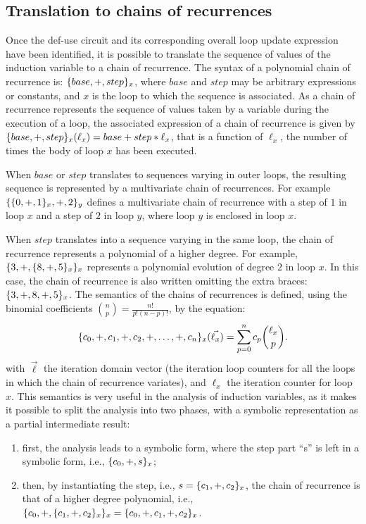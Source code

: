 \subsection{Translation to chains of recurrences}

Once the def-use circuit  and its corresponding overall loop
update expression have been identified, it is possible to translate the
sequence of values of the induction variable to a chain of recurrence.
The syntax of a polynomial chain of recurrence is: $\{base, +,
  step\}_x$, where $base$ and $step$ may be arbitrary expressions
or constants, and $x$ is the loop to which the sequence is
associated.  As a chain of recurrence represents the sequence of values
taken by a variable during the execution of a loop, the associated expression of a
chain of recurrence is given by $\{base, +, step\}_x (\ell_x) =
base + step * \ell_x$, that is a function of $\ell_x$,
the number of times the body of loop $x$ has been executed.

When $base$ or $step$ translates to sequences varying in outer
loops, the resulting sequence is represented by a multivariate chain
of recurrences.  For example $\{\{0, +, 1\}_x, +, 2\}_y$
defines a multivariate chain of recurrence with a step of $1$ in loop
$x$ and a step of $2$ in loop $y$, where loop $y$ is enclosed in loop
$x$.

When $step$ translates into a sequence varying in the same loop,
the chain of recurrence represents a polynomial of a higher degree.
For example, $\{3, +, \{8, +, 5\}_x\}_x$ represents a
polynomial evolution of degree $2$ in loop $x$.  In this case,
the chain of recurrence is also written omitting the extra braces:
$\{3, +, 8, +, 5\}_x$.  The semantics of the chains of recurrences
is defined, using the binomial coefficients $\binom{n}{p} = \frac{n!}{p!(n-p)!}$, by the
equation:
\begin{equation*}
  \{c_0,+,c_1,+,c_2,+,\ldots,+,c_n\}_x(\vec{\ell_x})=
  \sum_{p=0}^{n}c_{p}\binom{\ell_x}{p}.
\end{equation*}
with $\vec{\ell}$ the iteration domain vector (the iteration loop
counters for all the loops in which the chain of recurrence variates),
and $\ell_x$ the iteration counter for loop $x$.  This semantics is very useful in the analysis of induction variables, as it
makes it possible to split the analysis into two phases, with a
symbolic representation as a partial intermediate result:
\begin{enumerate}
\item first, the analysis leads to a symbolic form, where the step
  part ``s'' is left in a symbolic form, i.e., $\{c_0, +, s\}_x$;
\item then, by instantiating the step, i.e., $s = \{c_1, +,
  c_2\}_x$, the chain of recurrence is that of a higher degree
  polynomial, i.e., $\{c_0, +, \{c_1, +, c_2\}_x\}_x =
  \{c_0, +, c_1, +, c_2\}_x$.
\end{enumerate}

